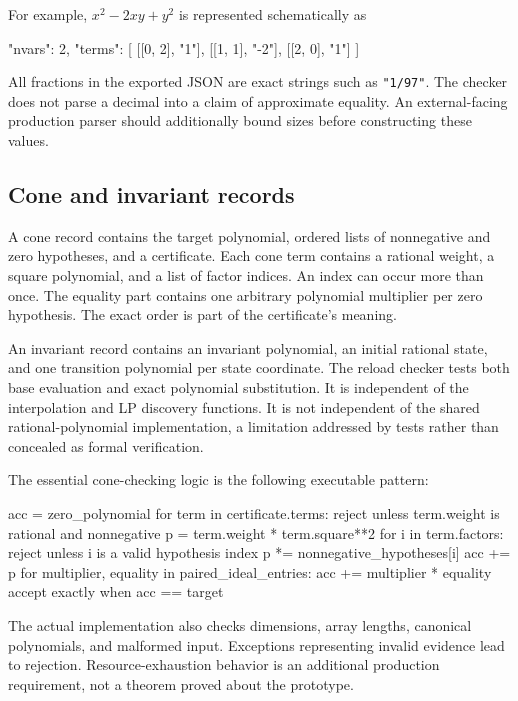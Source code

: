 \documentclass[11pt,a4paper]{article}
\newcommand{\code}[1]{\texttt{\small #1}}
\begin{document}
For example, $x^2-2xy+y^2$ is represented schematically as
\begin{Code}
{
  "nvars": 2,
  "terms": [
    [[0, 2], "1"],
    [[1, 1], "-2"],
    [[2, 0], "1"]
  ]
}
\end{Code}

All fractions in the exported JSON are exact strings such as \code{"1/97"}.
The checker does not parse a decimal into a claim of approximate equality.
An external-facing production parser should additionally bound sizes before
constructing these values.

\subsection{Cone and invariant records}

A cone record contains the target polynomial, ordered lists of nonnegative
and zero hypotheses, and a certificate. Each cone term contains a rational
weight, a square polynomial, and a list of factor indices. An index can occur
more than once. The equality part contains one arbitrary polynomial multiplier
per zero hypothesis. The exact order is part of the certificate's meaning.

An invariant record contains an invariant polynomial, an initial rational state,
and one transition polynomial per state coordinate. The reload checker tests
both base evaluation and exact polynomial substitution. It is independent of
the interpolation and LP discovery functions. It is not independent of the
shared rational-polynomial implementation, a limitation addressed by tests
rather than concealed as formal verification.

The essential cone-checking logic is the following executable pattern:
\begin{Code}
acc = zero_polynomial
for term in certificate.terms:
    reject unless term.weight is rational and nonnegative
    p = term.weight * term.square**2
    for i in term.factors:
        reject unless i is a valid hypothesis index
        p *= nonnegative_hypotheses[i]
    acc += p
for multiplier, equality in paired_ideal_entries:
    acc += multiplier * equality
accept exactly when acc == target
\end{Code}

The actual implementation also checks dimensions, array lengths, canonical
polynomials, and malformed input. Exceptions representing invalid evidence
lead to rejection. Resource-exhaustion behavior is an additional production
requirement, not a theorem proved about the prototype.
\end{document}
